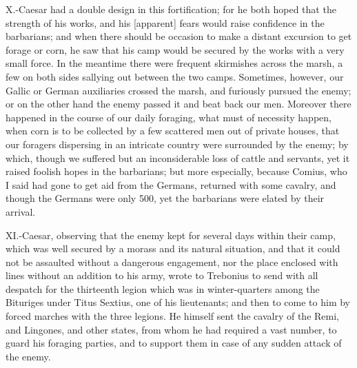 X.-Caesar had a double design in this fortification; for he both hoped
that the strength of his works, and his [apparent] fears would raise
confidence in the barbarians; and when there should be occasion to make
a distant excursion to get forage or corn, he saw that his camp would be
secured by the works with a very small force. In the meantime there were
frequent skirmishes across the marsh, a few on both sides sallying out
between the two camps. Sometimes, however, our Gallic or German
auxiliaries crossed the marsh, and furiously pursued the enemy; or on
the other hand the enemy passed it and beat back our men. Moreover there
happened in the course of our daily foraging, what must of necessity
happen, when corn is to be collected by a few scattered men out of
private houses, that our foragers dispersing in an intricate country
were surrounded by the enemy; by which, though we suffered but an
inconsiderable loss of cattle and servants, yet it raised foolish hopes
in the barbarians; but more especially, because Comius, who I said had
gone to get aid from the Germans, returned with some cavalry, and though
the Germans were only 500, yet the barbarians were elated by their
arrival.

XI.-Caesar, observing that the enemy kept for several days within their
camp, which was well secured by a morass and its natural situation, and
that it could not be assaulted without a dangerous engagement, nor the
place enclosed with lines without an addition to his army, wrote to
Trebonius to send with all despatch for the thirteenth legion which was
in winter-quarters among the Bituriges under Titus Sextius, one of his
lieutenants; and then to come to him by forced marches with the three
legions. He himself sent the cavalry of the Remi, and Lingones, and
other states, from whom he had required a vast number, to guard his
foraging parties, and to support them in case of any sudden attack of
the enemy.

